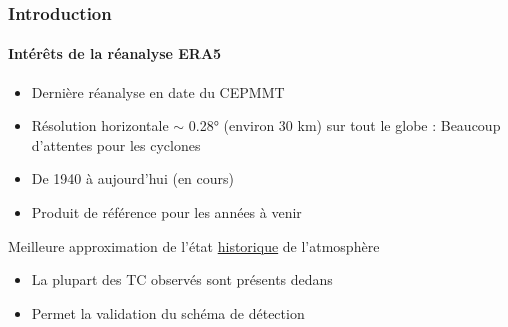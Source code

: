 \documentclass[aspectratio=169, usepdftitle=false, xcolor={dvipsnames}, 9pt,table]{beamer}
\begin{document}

\begin{frame}[t]
    \frametitle{Introduction}
    \framesubtitle{Intérêts de la réanalyse ERA5}
    \small
    \begin{definition}
        \footnotesize
        \begin{itemize}
            \item Dernière réanalyse en date du CEPMMT
            \item Résolution horizontale $\sim$ 0.28° (environ \alert{30 km}) sur tout le globe : Beaucoup d'attentes pour les cyclones
            \item De 1940 à aujourd'hui (en cours)
            \item Produit de référence pour les années à venir
        \end{itemize}
    \end{definition}
    \vspace{1.5em}
    \small
    \begin{block}
        \footnotesize
        Meilleure approximation de l'état \underline{historique} de l'atmosphère
        \tcblower
        \begin{itemize}
            \footnotesize
            \item La plupart des TC observés sont présents dedans
            \item Permet la validation du schéma de détection
        \end{itemize}
    \end{block}
\end{frame}
 
\end{document}
